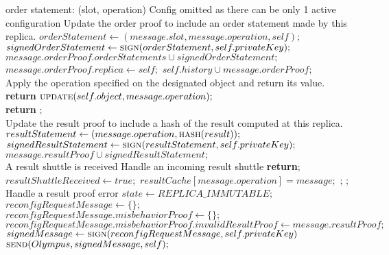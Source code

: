 \begin{algorithmic}[1]
\Comment order statement: (slot, operation) Config omitted as there can be only 1 active configuration
 \Comment Update the order proof to include an order statement made by this replica.
	\State $orderStatement\gets (message.slot, message.operation, self);$
    \State $signedOrderStatement\gets \Call{sign}{orderStatement, self.privateKey};$
	\State $message.orderProof.orderStatements \cup signedOrderStatement;$
    \State $message.orderProof.replica\gets self;$
    \State $self.history \cup message.orderProof;$
\EndFunction
\\

 \Comment Apply the operation specified on the designated object and return its value.
\State \textbf{return} $\Call{update}{self.object, message.operation};$
\EndFunction
\\

	\State \textbf{return} ;
\EndFunction
\\

 \Comment Update the result proof to include a hash of the result computed at this replica.
	\State $resultStatement\gets (message.operation, \Call{hash}{result});$
    \State $signedResultStatement\gets \Call{sign}{resultStatement, self.privateKey};$
	\State $message.resultProof \cup signedResultStatement;$
\EndFunction
\\

\Require A result shuttle is received
 \Comment Handle an incoming result shuttle
    	\State \textbf{return};
    \EndIf
        \State $resultShuttleReceived\gets true;$
        \State $resultCache[message.operation] = message;$
        \State {};
    \Else
        \State {};
    \EndIf
\EndFunction
\\

 \Comment Handle a result proof error
    \State $state\gets REPLICA\_IMMUTABLE;$
    \State $reconfigRequestMessage\gets \{\};$
    \State $reconfigRequestMessage.misbehaviorProof\gets \{\};$
    \State $reconfigRequestMessage.misbehaviorProof.invalidResultProof\gets message.resultProof;$
    \State $signedMessage\gets \Call{sign}{reconfigRequestMessage, self.privateKey}$
    \State $\Call {send}{Olympus, signedMessage, self};$
\EndFunction
\\


\end{algorithmic}
